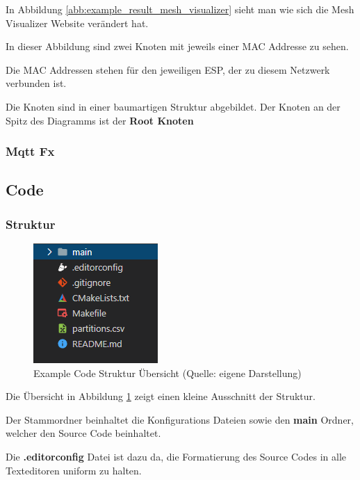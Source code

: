 In Abbildung \ref{abb:example_result_mesh_visualizer} sieht man wie sich die Mesh Visualizer Website verändert hat.

In dieser Abbildung sind zwei Knoten mit jeweils einer MAC Addresse zu sehen.

Die MAC Addressen stehen für den jeweiligen ESP, der zu diesem Netzwerk verbunden ist.

Die Knoten sind in einer baumartigen Struktur abgebildet. Der Knoten an der Spitz des Diagramms ist der \textbf{Root Knoten}

\subsubsection{Mqtt Fx}
\subsection{Code}\label{sec:code}
\subsubsection{Struktur}

\begin{figure}[H]
    \begin{center}
        \includegraphics[scale=0.8]{images/example_code_structure_overview.png}
        \caption{Example Code Struktur Übersicht (Quelle: eigene Darstellung)}
        \label{abb:example_code_structure_overview}
    \end{center}
\end{figure}

Die Übersicht in Abbildung \ref{abb:example_code_structure_overview} zeigt einen kleine Ausschnitt der Struktur.

Der Stammordner beinhaltet die Konfigurations Dateien sowie den \textbf{main} Ordner, welcher den Source Code beinhaltet.

Die \textbf{.editorconfig} Datei ist dazu da, die Formatierung des Source Codes in alle Texteditoren uniform zu halten.

